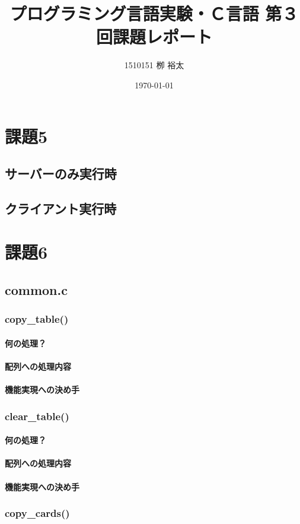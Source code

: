 \documentclass[11pt,a4paper, uplatex]{jsarticle}
\title{プログラミング言語実験・Ｃ言語 第３回課題レポート}
\author{1510151  栁 裕太}
\date{\today}
\begin{document}
\section{課題5}
%
\subsection{サーバーのみ実行時}
%
\subsection{クライアント実行時}
%
\section{課題6}
%
\subsection{common.c}
%
\subsubsection{copy\_table()}
\paragraph{何の処理？}
\paragraph{配列への処理内容}
\paragraph{機能実現への決め手}

%
\subsubsection{clear\_table()}
\paragraph{何の処理？}
\paragraph{配列への処理内容}
\paragraph{機能実現への決め手}
%
\subsubsection{copy\_cards()}
\end{document}
